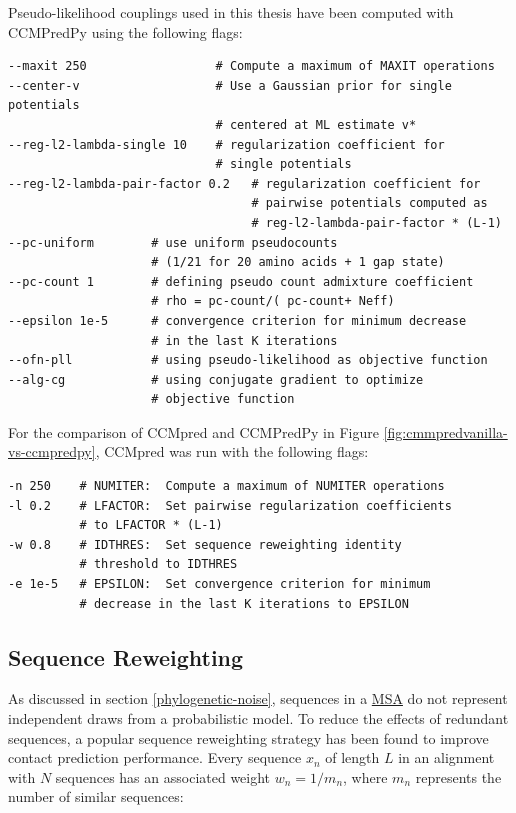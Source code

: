 \documentclass[11pt,a4paper,twoside]{book}
\theoremstyle{definition}
\theoremstyle{definition}
\theoremstyle{remark}
\begin{document}
Pseudo-likelihood couplings used in this thesis have been computed with
CCMPredPy using the following flags:

\begin{verbatim}
--maxit 250                  # Compute a maximum of MAXIT operations
--center-v                   # Use a Gaussian prior for single potentials 
                             # centered at ML estimate v*          
--reg-l2-lambda-single 10    # regularization coefficient for 
                             # single potentials
--reg-l2-lambda-pair-factor 0.2   # regularization coefficient for 
                                  # pairwise potentials computed as 
                                  # reg-l2-lambda-pair-factor * (L-1)
--pc-uniform        # use uniform pseudocounts 
                    # (1/21 for 20 amino acids + 1 gap state) 
--pc-count 1        # defining pseudo count admixture coefficient 
                    # rho = pc-count/( pc-count+ Neff)
--epsilon 1e-5      # convergence criterion for minimum decrease 
                    # in the last K iterations
--ofn-pll           # using pseudo-likelihood as objective function
--alg-cg            # using conjugate gradient to optimize 
                    # objective function
\end{verbatim}

For the comparison of CCMpred and CCMPredPy in Figure
\ref{fig:cmmpredvanilla-vs-ccmpredpy}, CCMpred was run with the
following flags:

\begin{verbatim}
-n 250    # NUMITER:  Compute a maximum of NUMITER operations
-l 0.2    # LFACTOR:  Set pairwise regularization coefficients 
          # to LFACTOR * (L-1) 
-w 0.8    # IDTHRES:  Set sequence reweighting identity 
          # threshold to IDTHRES
-e 1e-5   # EPSILON:  Set convergence criterion for minimum 
          # decrease in the last K iterations to EPSILON
\end{verbatim}

\subsection{Sequence Reweighting}\label{seq-reweighting}

As discussed in section \ref{phylogenetic-noise}, sequences in a
\protect\hyperlink{abbrev}{MSA} do not represent independent draws from
a probabilistic model. To reduce the effects of redundant sequences, a
popular sequence reweighting strategy has been found to improve contact
prediction performance. Every sequence \(x_n\) of length \(L\) in an
alignment with \(N\) sequences has an associated weight \(w_n = 1/m_n\),
where \(m_n\) represents the number of similar sequences:
\end{document}
